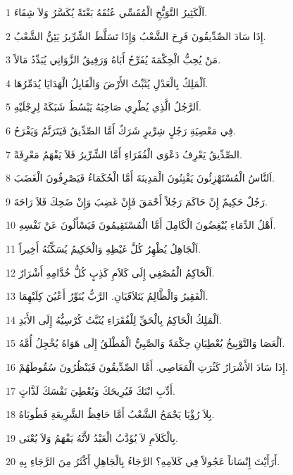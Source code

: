 \par 1 اَلْكَثِيرُ التَّوَبُّخِ الْمُقَسِّي عُنُقَهُ بَغْتَةً يُكَسَّرُ وَلاَ شِفَاءَ.
\par 2 إِذَا سَادَ الصِّدِّيقُونَ فَرِحَ الشَّعْبُ وَإِذَا تَسَلَّطَ الشِّرِّيرُ يَئِنُّ الشَّعْبُ.
\par 3 مَنْ يُحِبُّ الْحِكْمَةَ يُفَرِّحُ أَبَاهُ وَرَفِيقُ الزَّوَانِي يُبَدِّدُ مَالاً.
\par 4 اَلْمَلِكُ بِالْعَدْلِ يُثَبِّتُ الأَرْضَ وَالْقَابِلُ الْهَدَايَا يُدَمِّرُهَا.
\par 5 اَلرَّجُلُ الَّذِي يُطْرِي صَاحِبَهُ يَبْسُطُ شَبَكَةً لِرِجْلَيْهِ.
\par 6 فِي مَعْصِيَةِ رَجُلٍ شِرِّيرٍ شَرَكٌ أَمَّا الصِّدِّيقُ فَيَتَرَنَّمُ وَيَفْرَحُ.
\par 7 الصِّدِّيقُ يَعْرِفُ دَعْوَى الْفُقَرَاءِ أَمَّا الشِّرِّيرُ فَلاَ يَفْهَمُ مَعْرِفَةً.
\par 8 اَلنَّاسُ الْمُسْتَهْزِئُونَ يَفْتِنُونَ الْمَدِينَةَ أَمَّا الْحُكَمَاءُ فَيَصْرِفُونَ الْغَضَبَ.
\par 9 رَجُلٌ حَكِيمٌ إِنْ حَاكَمَ رَجُلاً أَحْمَقَ فَإِنْ غَضِبَ وَإِنْ ضَحِكَ فَلاَ رَاحَةَ.
\par 10 أَهْلُ الدِّمَاءِ يُبْغِضُونَ الْكَامِلَ أَمَّا الْمُسْتَقِيمُونَ فَيَسْأَلُونَ عَنْ نَفْسِهِ.
\par 11 اَلْجَاهِلُ يُظْهِرُ كُلَّ غَيْظِهِ وَالْحَكِيمُ يُسَكِّنُهُ أَخِيراً.
\par 12 اَلْحَاكِمُ الْمُصْغِي إِلَى كَلاَمِ كَذِبٍ كُلُّ خُدَّامِهِ أَشْرَارٌ.
\par 13 اَلْفَقِيرُ وَالْظَّالِمُ يَتَلاَقَيَانِ. الرَّبُّ يُنَوِّرُ أَعْيُنَ كِلَيْهِمَا.
\par 14 اَلْمَلِكُ الْحَاكِمُ بِالْحَقِّ لِلْفُقَرَاءِ يُثَبَّتُ كُرْسِيُّهُ إِلَى الأَبَدِ.
\par 15 اَلْعَصَا وَالتَّوْبِيخُ يُعْطِيَانِ حِكْمَةً وَالصَّبِيُّ الْمُطْلَقُ إِلَى هَوَاهُ يُخْجِلُ أُمَّهُ.
\par 16 إِذَا سَادَ الأَشْرَارُ كَثُرَتِ الْمَعَاصِي. أَمَّا الصِّدِّيقُونَ فَيَنْظُرُونَ سُقُوطَهُمْ.
\par 17 أَدِّبِ ابْنَكَ فَيُرِيحَكَ وَيُعْطِيَ نَفْسَكَ لَذَّاتٍ.
\par 18 بِلاَ رُؤْيَا يَجْمَحُ الشَّعْبُ أَمَّا حَافِظُ الشَّرِيعَةِ فَطُوبَاهُ.
\par 19 بِالْكَلاَمِ لاَ يُؤَدَّبُ الْعَبْدُ لأَنَّهُ يَفْهَمُ وَلاَ يُعْنَى.
\par 20 أَرَأَيْتَ إِنْسَاناً عَجُولاً فِي كَلاَمِهِ؟ الرَّجَاءُ بِالْجَاهِلِ أَكْثَرُ مِنَ الرَّجَاءِ بِهِ.
